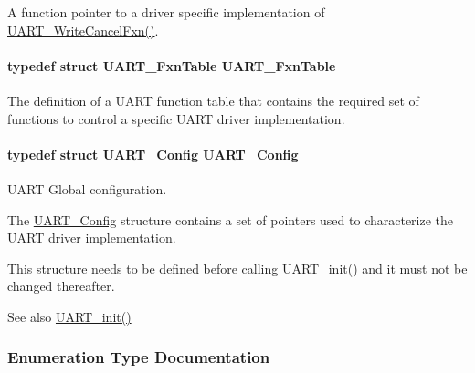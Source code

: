 A function pointer to a driver specific implementation of \hyperlink{_u_a_r_t_8h_ac5a3d974279a2d161746dfbc8ca91774}{U\+A\+R\+T\+\_\+\+Write\+Cancel\+Fxn()}. 

\paragraph[{U\+A\+R\+T\+\_\+\+Fxn\+Table}]{\setlength{\rightskip}{0pt plus 5cm}typedef struct {\bf U\+A\+R\+T\+\_\+\+Fxn\+Table}  {\bf U\+A\+R\+T\+\_\+\+Fxn\+Table}}\label{_u_a_r_t_8h_a24d497f125179ba5e5b16ad9a0aa249d}


The definition of a U\+A\+R\+T function table that contains the required set of functions to control a specific U\+A\+R\+T driver implementation. 

\paragraph[{U\+A\+R\+T\+\_\+\+Config}]{\setlength{\rightskip}{0pt plus 5cm}typedef struct {\bf U\+A\+R\+T\+\_\+\+Config}  {\bf U\+A\+R\+T\+\_\+\+Config}}\label{_u_a_r_t_8h_ae513322c7d3184d66173cba9349989a4}


U\+A\+R\+T Global configuration. 

The \hyperlink{struct_u_a_r_t___config}{U\+A\+R\+T\+\_\+\+Config} structure contains a set of pointers used to characterize the U\+A\+R\+T driver implementation.

This structure needs to be defined before calling \hyperlink{_u_a_r_t_8h_ab60a36f7295d704926120d22f806dcd1}{U\+A\+R\+T\+\_\+init()} and it must not be changed thereafter.

\begin{DoxySeeAlso}{See also}
\hyperlink{_u_a_r_t_8h_ab60a36f7295d704926120d22f806dcd1}{U\+A\+R\+T\+\_\+init()} 
\end{DoxySeeAlso}


\subsubsection{Enumeration Type Documentation}
